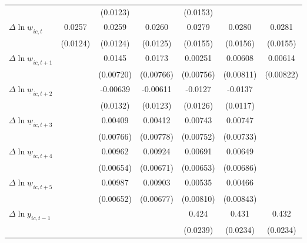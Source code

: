 {\begin{tabular}{l*{6}{c}}
          &                  & (0.0123)         &                  & (0.0153)         &                  &                  \\
[1em]
$\Delta \ln \underline{w}_{ic,t}$&   0.0257\sym{**} &   0.0259\sym{**} &   0.0260\sym{**} &   0.0279\sym{*}  &   0.0280\sym{*}  &   0.0281\sym{*}  \\
          & (0.0124)         & (0.0124)         & (0.0125)         & (0.0155)         & (0.0156)         & (0.0155)         \\
[1em]
$\Delta \ln \underline{w}_{ic,t+1}$&                  &   0.0145\sym{*}  &   0.0173\sym{**} &  0.00251         &  0.00608         &  0.00614         \\
          &                  &(0.00720)         &(0.00766)         &(0.00756)         &(0.00811)         &(0.00822)         \\
[1em]
$\Delta \ln \underline{w}_{ic,t+2}$&                  & -0.00639         & -0.00611         &  -0.0127         &  -0.0137         &                  \\
          &                  & (0.0132)         & (0.0123)         & (0.0126)         & (0.0117)         &                  \\
[1em]
$\Delta \ln \underline{w}_{ic,t+3}$&                  &  0.00409         &  0.00412         &  0.00743         &  0.00747         &                  \\
          &                  &(0.00766)         &(0.00778)         &(0.00752)         &(0.00733)         &                  \\
[1em]
$\Delta \ln \underline{w}_{ic,t+4}$&                  &  0.00962         &  0.00924         &  0.00691         &  0.00649         &                  \\
          &                  &(0.00654)         &(0.00671)         &(0.00653)         &(0.00686)         &                  \\
[1em]
$\Delta \ln \underline{w}_{ic,t+5}$&                  &  0.00987         &  0.00903         &  0.00535         &  0.00466         &                  \\
          &                  &(0.00652)         &(0.00677)         &(0.00810)         &(0.00843)         &                  \\
[1em]
$\Delta \ln y_{ic,t-1}$&                  &                  &                  &    0.424\sym{***}&    0.431\sym{***}&    0.432\sym{***}\\
          &                  &                  &                  & (0.0239)         & (0.0234)         & (0.0234)         \\

\end{tabular}}
